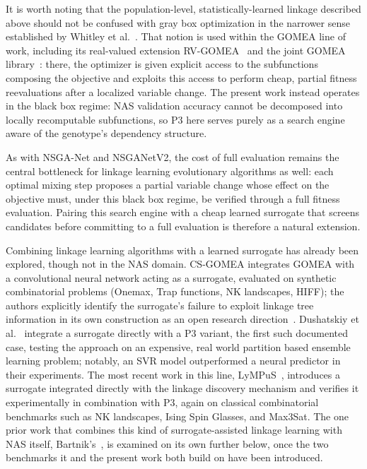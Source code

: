 It is worth noting that the population-level, statistically-learned linkage described above should not be confused with gray box optimization in the narrower sense established by Whitley et al.~\citep{whitley2016graybox}. That notion is used within the GOMEA line of work, including its real-valued extension RV-GOMEA~\citep{andreadis2024maxclique} and the joint GOMEA library~\citep{bouter2023library}: there, the optimizer is given explicit access to the subfunctions composing the objective and exploits this access to perform cheap, partial fitness reevaluations after a localized variable change. The present work instead operates in the black box regime: NAS validation accuracy cannot be decomposed into locally recomputable subfunctions, so P3 here serves purely as a search engine aware of the genotype's dependency structure.

As with NSGA-Net and NSGANetV2, the cost of full evaluation remains the central bottleneck for linkage learning evolutionary algorithms as well: each optimal mixing step proposes a partial variable change whose effect on the objective must, under this black box regime, be verified through a full fitness evaluation. Pairing this search engine with a cheap learned surrogate that screens candidates before committing to a full evaluation is therefore a natural extension.

Combining linkage learning algorithms with a learned surrogate has already been explored, though not in the NAS domain. CS-GOMEA integrates GOMEA with a convolutional neural network acting as a surrogate, evaluated on synthetic combinatorial problems (Onemax, Trap functions, NK landscapes, HIFF); the authors explicitly identify the surrogate's failure to exploit linkage tree information in its own construction as an open research direction~\citep{dushatskiy2019csgomea}. Dushatskiy et al.~\citep{dushatskiy2021novelsurrogateassistedevolutionaryalgorithm} integrate a surrogate directly with a P3 variant, the first such documented case, testing the approach on an expensive, real world partition based ensemble learning problem; notably, an SVR model outperformed a neural predictor in their experiments. The most recent work in this line, LyMPuS~\citep{przewozniczek2026lympus}, introduces a surrogate integrated directly with the linkage discovery mechanism and verifies it experimentally in combination with P3, again on classical combinatorial benchmarks such as NK landscapes, Ising Spin Glasses, and Max3Sat. The one prior work that combines this kind of surrogate-assisted linkage learning with NAS itself, Bartnik's~\citep{bartnik2026evolutionary}, is examined on its own further below, once the two benchmarks it and the present work both build on have been introduced.

